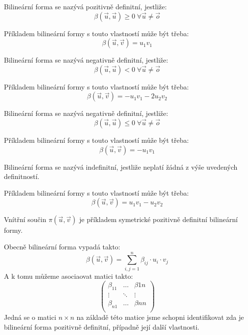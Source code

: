 \begin{definition}
    Bilineární forma se nazývá pozitivně definitní, jestliže:
    $$\beta(\vec{u}, \vec{u}) \geq 0 \; \forall \vec{u} \neq \vec{o}$$

    Příkladem bilineární formy s touto vlastností může být třeba:
    $$\beta(\vec{u}, \vec{v}) = u_1 v_1$$
\end{definition}

\begin{definition}
    Bilineární forma se nazývá negativně definitní, jestliže:
    $$\beta(\vec{u}, \vec{u}) < 0 \; \forall \vec{u} \neq \vec{o}$$

    Příkladem bilineární formy s touto vlastností může být třeba:
    $$\beta(\vec{u}, \vec{v}) = -u_1 v_1 - 2 u_2 v_2$$
\end{definition}

\begin{definition}
    Bilineární forma se nazývá negativně definitní, jestliže:
    $$\beta(\vec{u}, \vec{u}) \leq 0 \; \forall \vec{u} \neq \vec{o}$$

    Příkladem bilineární formy s touto vlastností může být třeba:
    $$\beta(\vec{u}, \vec{v}) = -u_1 v_1$$
\end{definition}

\begin{definition}
    Bilineární forma se nazývá indefinitní, jestliže neplatí žádná z výše uvedených definitností.

    Příkladem bilineární formy s touto vlastností může být třeba:
    $$\beta(\vec{u}, \vec{v}) = u_1 v_1 - u_2 v_2$$
\end{definition}

Vnítřní součin $\pi(\vec{u}, \vec{v})$ je příkladem symetrické pozitivně definitní
bilineární formy.

Obecně bilineární forma vypadá takto:
$$\beta( \vec{u}, \vec{v} ) = \sum_{i,j = 1}^n \beta_{ij} \cdot u_i \cdot v_j$$
A k tomu můžeme asociaovat matici takto:
\[
\begin{pmatrix}
    \beta_{11} & \ldots & \beta{1n}\\
    \vdots & \ddots & \vdots\\
    \beta_{n1} & \ldots & \beta{ nn}\\
\end{pmatrix}
\]
Jedná se o matici $n\times n$ na základě této matice jsme schopni identifikovat
zda je bilineární forma pozitivně definitní, případně její další vlastnosti.

